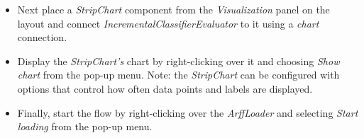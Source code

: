 \documentclass[a4paper]{article}
\begin{document}
\begin{itemize}
        \item Next place a \textit{StripChart} component from the \textit{Visualization}
        panel on the layout and connect \textit{IncrementalClassifierEvaluator} to it
        using a \textit{chart} connection.

        \item Display the \textit{StripChart's} chart by right-clicking over it and choosing
        \textit{Show chart} from the pop-up menu. Note: the \textit{StripChart} can be configured
        with options that control how often data points and labels are displayed.

        \item Finally, start the flow by right-clicking over the \textit{ArffLoader} and
        selecting \textit{Start loading} from the pop-up menu.        
\end{itemize}
\end{document}
